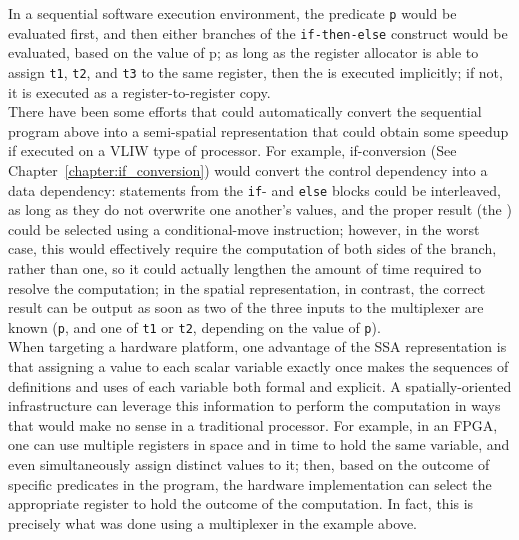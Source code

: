 In a sequential software execution environment, the predicate {\tt p} 
would be evaluated  first, and then either branches of the {\tt if-then-else} construct would be evaluated, 
based on the value of p; as long as the register allocator is able to assign 
{\tt t1}, {\tt t2}, and {\tt t3} to the same register, then the \phifun 
is executed implicitly; if not, it is executed as a register-to-register copy. \\

There have been some efforts that could automatically convert the
sequential program above into a semi-spatial representation that
could obtain some speedup if executed on a VLIW type of processor. 
For example, if-conversion (See Chapter~\ref{chapter:if_conversion}) would convert the control dependency into 
a data dependency: statements from the {\tt if}- 
and {\tt else} blocks could be interleaved, as long as they do not
overwrite one another's values, and the proper result
(the \phifun) could be selected using a 
conditional-move instruction; however, in the worst case, this would 
effectively require the computation of both sides of the branch, rather 
than one, so it could actually lengthen the amount of time required to 
resolve the computation; in the spatial representation, in contrast, the 
correct result can be output as soon as two of the three inputs to the 
multiplexer are known ({\tt p}, and one of {\tt t1} or {\tt t2}, depending 
on the value of {\tt p}). \\

When targeting a hardware platform, one advantage of the SSA
representation is that assigning a value to each scalar variable
exactly once makes the sequences of definitions and uses of
each variable both formal and explicit. 
A spatially-oriented infrastructure can leverage this information to perform 
the computation in ways that would make no sense in a traditional processor. 
For example, in an FPGA, one can use multiple registers in 
space and in time to hold the same variable, and even simultaneously assign 
distinct values to it; then, based on the outcome of specific predicates in 
the program, the hardware implementation can select the
appropriate register to hold the outcome of the computation. 
In fact, this is precisely what was done using a multiplexer in
the example above.\\

